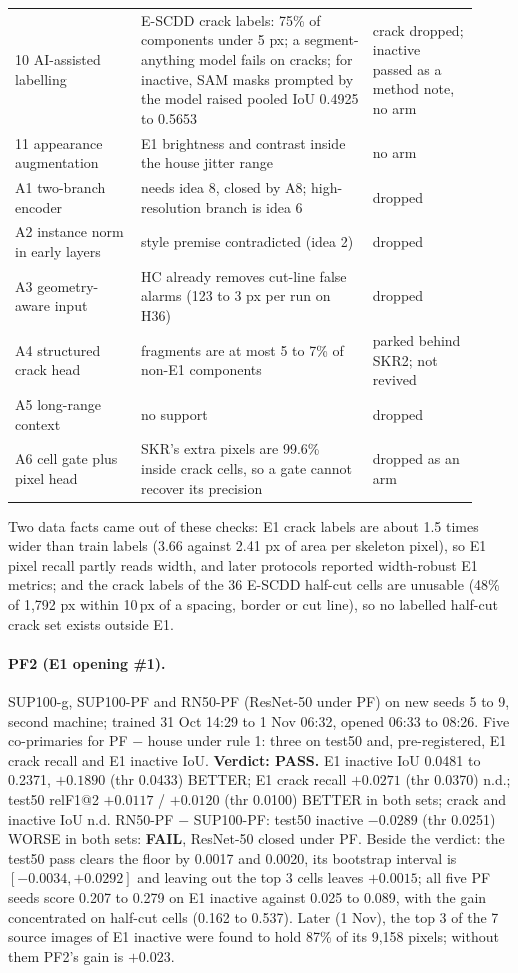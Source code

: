 \begin{table}[htbp]
\begin{tabular}{@{}p{0.25\linewidth}p{0.46\linewidth}p{0.21\linewidth}@{}}
10 AI-assisted labelling & E-SCDD crack labels: 75\% of components under 5 px; a segment-anything model fails on cracks; for inactive, SAM masks prompted by the model raised pooled IoU 0.4925 to 0.5653 & crack dropped; inactive passed as a method note, no arm \\
11 appearance augmentation & E1 brightness and contrast inside the house jitter range & no arm \\
\midrule
A1 two-branch encoder & needs idea 8, closed by A8; high-resolution branch is idea 6 & dropped \\
A2 instance norm in early layers & style premise contradicted (idea 2) & dropped \\
A3 geometry-aware input & HC already removes cut-line false alarms (123 to 3 px per run on H36) & dropped \\
A4 structured crack head & fragments are at most 5 to 7\% of non-E1 components & parked behind SKR2; not revived \\
A5 long-range context & no support & dropped \\
A6 cell gate plus pixel head & SKR's extra pixels are 99.6\% inside crack cells, so a gate cannot recover its precision & dropped as an arm \\
\bottomrule
\end{tabular}
\end{table}

Two data facts came out of these checks: E1 crack labels are about 1.5 times wider than train labels (3.66 against 2.41 px of area
per skeleton pixel), so E1 pixel recall partly reads width, and later protocols reported width-robust E1 metrics; and the crack
labels of the 36 E-SCDD half-cut cells are unusable (48\% of 1,792 px within 10\,px of a spacing, border or cut line), so no labelled
half-cut crack set exists outside E1.

\paragraph{PF2 (E1 opening \#1).} SUP100-g, SUP100-PF and RN50-PF (ResNet-50 under PF) on new seeds 5 to 9, second machine; trained 31 Oct
14:29 to 1 Nov 06:32, opened 06:33 to 08:26. Five co-primaries for PF $-$ house under rule 1: three on test50 and, pre-registered,
E1 crack recall and E1 inactive IoU. \textbf{Verdict: PASS.} E1 inactive IoU 0.0481 to 0.2371, $+0.1890$ (thr 0.0433) BETTER; E1
crack recall $+0.0271$ (thr 0.0370) n.d.; test50 relF1@2 $+0.0117$ / $+0.0120$ (thr 0.0100) BETTER in both sets; crack and inactive
IoU n.d. RN50-PF $-$ SUP100-PF: test50 inactive $-0.0289$ (thr 0.0251) WORSE in both sets: \textbf{FAIL}, ResNet-50 closed under PF.
Beside the verdict: the test50 pass clears the floor by 0.0017 and 0.0020, its bootstrap interval is $[-0.0034, +0.0292]$ and
leaving out the top 3 cells leaves $+0.0015$; all five PF seeds score 0.207 to 0.279 on E1 inactive against 0.025 to 0.089, with the
gain concentrated on half-cut cells (0.162 to 0.537). Later (1 Nov), the top 3 of the 7 source images of E1 inactive were found to
hold 87\% of its 9,158 pixels; without them PF2's gain is $+0.023$.

